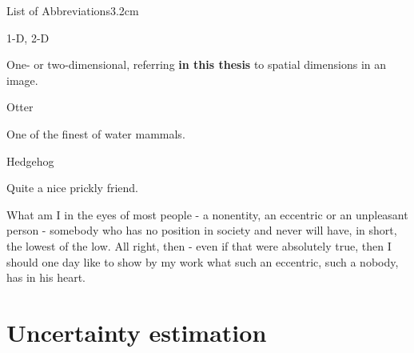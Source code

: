 \documentclass[a4paper, nobind]{templates/cdethesis}
\begin{document}
\begin{romanpages}
\listoffigures
	\mtcaddchapter

\listoftables
  \mtcaddchapter
\begin{mclistof}{List of Abbreviations}{3.2cm}

\item[1-D, 2-D]

One- or two-dimensional, referring \textbf{in this thesis} to spatial dimensions in an image.

\item[Otter]

One of the finest of water mammals.

\item[Hedgehog]

Quite a nice prickly friend.

\end{mclistof} 


\end{romanpages}

\flushbottom

\begin{savequote}
What am I in the eyes of most people - a nonentity, an eccentric or an
unpleasant person - somebody who has no position in society and never
will have, in short, the lowest of the low. All right, then - even if
that were absolutely true, then I should one day like to show by my work
what such an eccentric, such a nobody, has in his heart.
\end{savequote}



\hypertarget{uncertainty-estimation}{%
\chapter{Uncertainty estimation}\label{uncertainty-estimation}}
\end{document}
